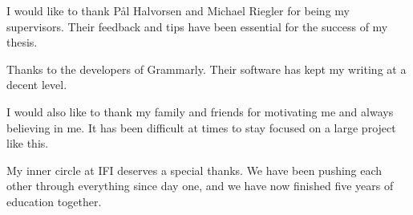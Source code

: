 I would like to thank Pål Halvorsen and Michael Riegler for being my supervisors. Their feedback and tips have been essential for the success of my thesis.

Thanks to the developers of Grammarly. Their software has kept my writing at a decent level.

I would also like to thank my family and friends for motivating me and always believing in me. It has been difficult at times to stay focused on a large project like this.

My inner circle at IFI deserves a special thanks. We have been pushing each other through everything since day one, and we have now finished five years of education together.